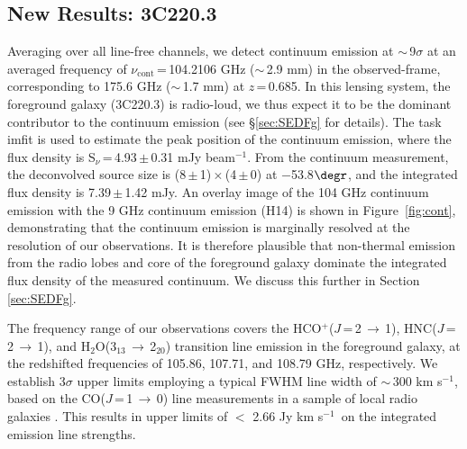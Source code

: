 \documentclass[twocolumn,apj,numberedappendix]{emulateapj}
\newcommand{\rarr}{$\rightarrow$}
\newcommand{\pmOne}{\mbox{$^{-1}$}}
\begin{document}
\subsection{New Results: 3C220.3}
Averaging over all line-free channels, we detect continuum emission at $\sim$\,9$\sigma$ at an averaged frequency of $\nu_\textrm{cont}$\,=\,104.2106 GHz ($\sim$\,2.9 mm) in the observed-frame, corresponding to 175.6 GHz ($\sim$\,1.7 mm) at $z$\,=\,0.685. In this lensing system, the
foreground galaxy (3C220.3) is radio-loud, we thus expect it to be the dominant contributor to the continuum emission (see \S \ref{sec:SEDFg} for details). The task {\sc imfit} is used to estimate the peak position of the continuum emission, where the flux density is S$_\nu$\,=\,4.93\,$\pm$\,0.31\,\,mJy\,\,beam\pmOne. From the continuum measurement, the deconvolved source size
is (8\,$\pm$\,1)\,$\times$\,(4\,$\pm$\,0) at $-$53.8$\degr$, and the integrated flux density is 7.39\,$\pm$\,1.42\,\,mJy. An overlay image of the 104 GHz
continuum emission with the 9 GHz continuum emission (H14) is shown in Figure~\ref{fig:cont}, demonstrating that the continuum
emission is marginally resolved at the resolution of our observations. It is therefore plausible that non-thermal emission from the radio lobes and core of the foreground galaxy dominate the integrated flux
density of the measured continuum. We discuss this further in Section \ref{sec:SEDFg}. \par
The frequency range of our observations covers the HCO$^+$($J$\,=\,2\,\rarr\,1), HNC($J$\,=\,2\,$\rightarrow$\,1), and H$_2$O(3$_{13}$\,\rarr\,2$_{20}$)
transition line emission in the foreground galaxy, at
the redshifted frequencies of 105.86, 107.71, and 108.79\,\,GHz, respectively. We establish 3$\sigma$ upper limits employing a typical FWHM line width of
$\sim$\,300\,\,km\,\,s\pmOne, based on the CO($J$\,=\,1\,$\rightarrow$\,0) line measurements in a sample of local radio galaxies \citep[$z$ $<$ 0.1; ][]{Smolcic11a}. This results in upper limits of $<$ 2.66\,\,Jy\,\,km\,\,s\pmOne\ on the integrated emission line strengths.
\end{document}
